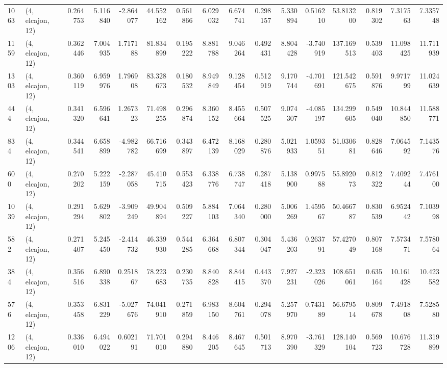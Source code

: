 \begin{tabular}{llrrrrrrrrrrrrrr}
1063 &  (4, elcajon, 12) &   0.264753 &   5.116840 &  -2.864077 &     44.552162 &    0.561866 &    6.029032 &    6.674741 &  0.298157 &   5.330894 &   0.516210 &    53.813200 &   0.819302 &   7.317563 &   7.335748 \\
1159 &  (4, elcajon, 12) &   0.362446 &   7.004935 &   1.717188 &     81.834899 &    0.195222 &    8.881788 &    9.046264 &  0.492431 &   8.804428 &  -3.740919 &   137.169513 &   0.539403 &  11.098425 &  11.711939 \\
1303 &  (4, elcajon, 12) &   0.360119 &   6.959976 &   1.796908 &     83.328673 &    0.180532 &    8.949849 &    9.128454 &  0.512919 &   9.170744 &  -4.701691 &   121.542675 &   0.591876 &   9.971799 &  11.024639 \\
444  &  (4, elcajon, 12) &   0.341320 &   6.596641 &   1.267323 &     71.498255 &    0.296874 &    8.360152 &    8.455664 &  0.507525 &   9.074307 &  -4.085197 &   134.299605 &   0.549040 &  10.844850 &  11.588771 \\
834  &  (4, elcajon, 12) &   0.344541 &   6.658899 &  -4.982782 &     66.716699 &    0.343897 &    6.472139 &    8.168029 &  0.280876 &   5.021933 &   1.059351 &    51.030681 &   0.828646 &   7.064592 &   7.143576 \\
600  &  (4, elcajon, 12) &   0.270202 &   5.222159 &  -2.287058 &     45.410715 &    0.553423 &    6.338776 &    6.738747 &  0.287418 &   5.138900 &   0.997588 &    55.892073 &   0.812322 &   7.409244 &   7.476100 \\
1039 &  (4, elcajon, 12) &   0.291294 &   5.629802 &  -3.909249 &     49.904894 &    0.509227 &    5.884103 &    7.064340 &  0.280000 &   5.006269 &   1.459567 &    50.466787 &   0.830539 &   6.952442 &   7.103998 \\
582  &  (4, elcajon, 12) &   0.271407 &   5.245450 &  -2.414732 &     46.339930 &    0.544285 &    6.364668 &    6.807344 &  0.304047 &   5.436203 &   0.263791 &    57.427049 &   0.807168 &   7.573471 &   7.578064 \\
384  &  (4, elcajon, 12) &   0.356516 &   6.890338 &   0.251867 &     78.223683 &    0.230735 &    8.840828 &    8.844415 &  0.443370 &   7.927231 &  -2.323026 &   108.651061 &   0.635164 &  10.161428 &  10.423582 \\
576  &  (4, elcajon, 12) &   0.353458 &   6.831229 &  -5.027676 &     74.041910 &    0.271859 &    6.983150 &    8.604761 &  0.294078 &   5.257970 &   0.743189 &    56.679514 &   0.809678 &   7.491808 &   7.528580 \\
1206 &  (4, elcajon, 12) &   0.336010 &   6.494022 &   0.602191 &     71.701010 &    0.294880 &    8.446205 &    8.467645 &  0.501713 &   8.970390 &  -3.761329 &   128.140104 &   0.569723 &  10.676728 &  11.319899 \\

\end{tabular}
